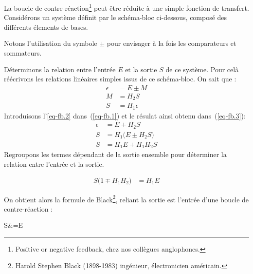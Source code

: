 La boucle de contre-réaction\footnote{\og Positive or negative feedback\fg, chez nos 
collègues anglophones.} peut 
être réduite à une simple fonction de transfert.
Considérons un système définit par le schéma-bloc ci-dessous, composé 
des différents élements de bases.

\begin{center}
\end{center}
Notons l'utilisation du symbole $\pm$ pour envisager à la fois les 
comparateurs et sommateurs.

Déterminons la relation entre l'entrée $E$ et la sortie $S$ de ce système.
Pour celà réécrivons les relations linéaires simples issus de ce schéma-bloc.
On sait que :
\begin{align}
    \epsilon&=E\pm M \label{eq-fb.1}\\
    M&=H_2S       \label{eq-fb.2}\\
    S&=H_1\epsilon \label{eq-fb.3}
\end{align}
Introduisons l'\cref{eq-fb.2} dans~(\ref{eq-fb.1}) et le résulat ainsi obtenu dans~(\ref{eq-fb.3}):
\begin{align*}
    \epsilon&=E\pm H_2S \\
     S&=H_1\big(E\pm H_2S\big) \\
     S&=H_1E\pm H_1H_2S
\end{align*}
Regroupons les termes dépendant de la sortie ensemble pour déterminer 
la relation entre l'entrée et la sortie.

\begin{align*}
    S\big(1\mp H_1H_2\big)&=H_1E 
\end{align*}

On obtient alors la formule de Black\footnote{Harold Stephen Black (1898-1983) ingénieur, 
électronicien américain.}, 
reliant la sortie est l'entrée d'une boucle de contre-réaction :
\begin{bequation}
    S&=E
\end{bequation}

